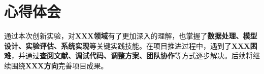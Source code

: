 \documentclass{style/course-report}
\begin{document}
\section{心得体会}

通过本次创新实验，对\textbf{XXX领域}有了更加深入的理解，也掌握了\textbf{数据处理、模型设计、实验评估、系统实现}等关键实践技能。在项目推进过程中，遇到了\textbf{XXX困难}，并通过\textbf{查阅文献、调试代码、调整方案、团队协作}等方式逐步解决。后续将继续围绕\textbf{XXX方向}完善项目成果。


\end{document}
